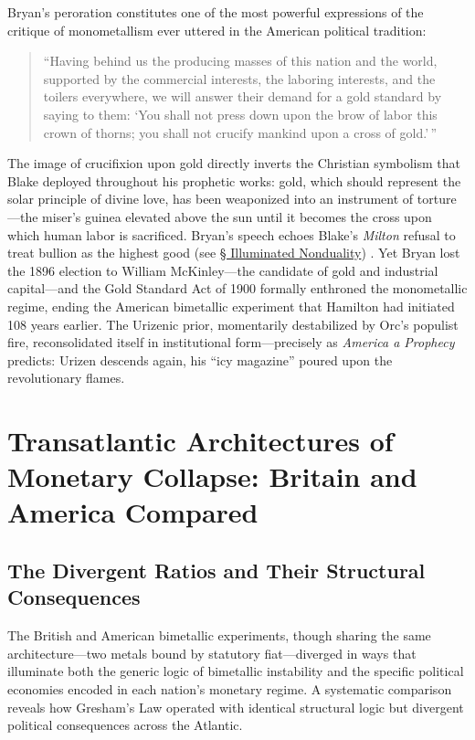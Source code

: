 \documentclass[
]{article}
\begin{document}
Bryan's peroration constitutes one of the most powerful expressions of
the critique of monometallism ever uttered in the American political
tradition:

\begin{quote}
``Having behind us the producing masses of this nation and the world,
supported by the commercial interests, the laboring interests, and the
toilers everywhere, we will answer their demand for a gold standard by
saying to them: `You shall not press down upon the brow of labor this
crown of thorns; you shall not crucify mankind upon a cross of
gold.'\,''
\end{quote}

The image of crucifixion upon gold directly inverts the Christian
symbolism that Blake deployed throughout his prophetic works: gold,
which should represent the solar principle of divine love, has been
weaponized into an instrument of torture---the miser's guinea elevated
above the sun until it becomes the cross upon which human labor is
sacrificed. Bryan's speech echoes Blake's \emph{Milton} refusal to treat
bullion as the highest good (see \hyperref[sec-illuminated-nonduality]{§
Illuminated Nonduality}) \citep{erdman1988complete}. Yet Bryan lost the
1896 election to William McKinley---the candidate of gold and industrial
capital---and the Gold Standard Act of 1900 formally enthroned the
monometallic regime, ending the American bimetallic experiment that
Hamilton had initiated 108 years earlier. The Urizenic prior,
momentarily destabilized by Orc's populist fire, reconsolidated itself
in institutional form---precisely as \emph{America a Prophecy} predicts:
Urizen descends again, his ``icy magazine'' poured upon the
revolutionary flames.

\newpage

\section{Transatlantic Architectures of Monetary Collapse: Britain and
America
Compared}\label{transatlantic-architectures-of-monetary-collapse-britain-and-america-compared}

\subsection{The Divergent Ratios and Their Structural
Consequences}\label{the-divergent-ratios-and-their-structural-consequences}

The British and American bimetallic experiments, though sharing the same
architecture---two metals bound by statutory fiat---diverged in ways
that illuminate both the generic logic of bimetallic instability and the
specific political economies encoded in each nation's monetary regime. A
systematic comparison reveals how Gresham's Law operated with identical
structural logic but divergent political consequences across the
Atlantic.
\end{document}
